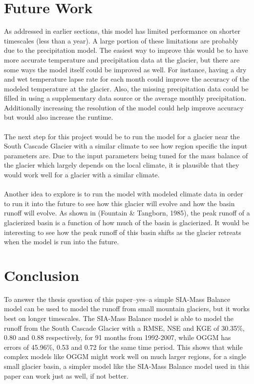 \documentclass{article}
\begin{document}
\section{Future Work}
As addressed in earlier sections, this model has limited performance on shorter timescales (less than a year). A large portion of these limitations 
are probably due to the precipitation model. The easiest way to improve this would be to have more accurate temperature and precipitation data at the glacier, but 
there are some ways the model itself could be improved as well. For instance, having a dry and wet temperature lapse rate for each month could improve the accuracy of the modeled 
temperature at the glacier. Also, the missing precipitation data could be filled in using a supplementary data source or the average monthly precipitation.
Additionally increasing the resolution of the model could help improve accuracy but would also increase the runtime.
\paragraph{}
The next step for this project would be to run the model for a glacier near the South Cascade Glacier with a similar climate to see how region specific the input 
parameters are. Due to the input parameters being tuned for the mass balance of the glacier which largely depends on the local climate, it 
is plausible that they would work well for a glacier with a similar climate.
\paragraph{}
Another idea to explore is to run the model with modeled climate data in order to run it into the future to see how this glacier 
will evolve and how the basin runoff will evolve. As shown in (Fountain \& Tangborn, 1985), the peak runoff of a glacierized basin is a function of 
how much of the basin is glacierized. It would be interesting to see how the peak runoff of this basin shifts as the glacier retreats when the model 
is run into the future.
\section{Conclusion}
\paragraph{}
To answer the thesis question of this paper--yes--a simple SIA-Mass Balance model can be used to model the runoff from small mountain glaciers, but 
it works best on longer timescales.
The SIA-Mass Balance model is able to model the runoff from the South Cascade Glacier with a RMSE, NSE and KGE of 30.35\%, 0.80 and 0.88 respectively, 
for 91 months from 1992-2007, while OGGM has errors of 45.96\%, 0.53 and 0.72 for the same time period. 
This shows that while complex models like OGGM might work well on much larger regions, for a single small glacier basin, a simpler model like the SIA-Mass 
Balance model used in this paper can work just as well, if not better.
\end{document}
